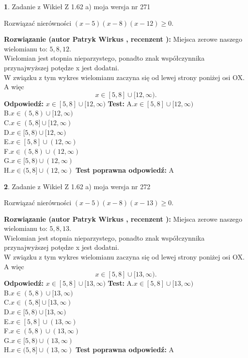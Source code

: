 \documentclass[12pt, a4paper]{article}
\theoremstyle{definition} %
\newtheorem{zad}{}
\newcommand{\zadStart}[1]{\begin{zad}#1\newline}
\newcommand{\zadStop}{\end{zad}}
\newcommand{\rozwStart}[2]{\noindent \textbf{Rozwiązanie (autor #1 , recenzent #2): }\newline}
\newcommand{\rozwStop}{\newline}
\newcommand{\odpStart}{\noindent \textbf{Odpowiedź:}\newline}
\newcommand{\odpStop}{\newline}
\newcommand{\testStart}{\noindent \textbf{Test:}\newline}
\newcommand{\testStop}{\newline}
\newcommand{\kluczStart}{\noindent \textbf{Test poprawna odpowiedź:}\newline}
\newcommand{\kluczStop}{\newline}
\begin{document}
\zadStart{Zadanie z Wikieł Z 1.62 a) moja wersja nr 271}

Rozwiązać nierówności $(x-5)(x-8)(x-12)\ge0$.
\zadStop
\rozwStart{Patryk Wirkus}{}
Miejsca zerowe naszego wielomianu to: $5, 8, 12$.\\
Wielomian jest stopnia nieparzystego, ponadto znak współczynnika przy\linebreak najwyższej potędze x jest dodatni.\\ W związku z tym wykres wielomianu zaczyna się od lewej strony poniżej osi OX. A więc $$x \in [5,8] \cup [12,\infty).$$
\rozwStop
\odpStart
$x \in [5,8] \cup [12,\infty)$
\odpStop
\testStart
A.$x \in [5,8] \cup [12,\infty)$\\
B.$x \in (5,8) \cup [12,\infty)$\\
C.$x \in (5,8] \cup [12,\infty)$\\
D.$x \in [5,8) \cup [12,\infty)$\\
E.$x \in [5,8] \cup (12,\infty)$\\
F.$x \in (5,8) \cup (12,\infty)$\\
G.$x \in [5,8) \cup (12,\infty)$\\
H.$x \in (5,8] \cup (12,\infty)$
\testStop
\kluczStart
A
\kluczStop



\zadStart{Zadanie z Wikieł Z 1.62 a) moja wersja nr 272}

Rozwiązać nierówności $(x-5)(x-8)(x-13)\ge0$.
\zadStop
\rozwStart{Patryk Wirkus}{}
Miejsca zerowe naszego wielomianu to: $5, 8, 13$.\\
Wielomian jest stopnia nieparzystego, ponadto znak współczynnika przy\linebreak najwyższej potędze x jest dodatni.\\ W związku z tym wykres wielomianu zaczyna się od lewej strony poniżej osi OX. A więc $$x \in [5,8] \cup [13,\infty).$$
\rozwStop
\odpStart
$x \in [5,8] \cup [13,\infty)$
\odpStop
\testStart
A.$x \in [5,8] \cup [13,\infty)$\\
B.$x \in (5,8) \cup [13,\infty)$\\
C.$x \in (5,8] \cup [13,\infty)$\\
D.$x \in [5,8) \cup [13,\infty)$\\
E.$x \in [5,8] \cup (13,\infty)$\\
F.$x \in (5,8) \cup (13,\infty)$\\
G.$x \in [5,8) \cup (13,\infty)$\\
H.$x \in (5,8] \cup (13,\infty)$
\testStop
\kluczStart
A
\kluczStop
\end{document}
